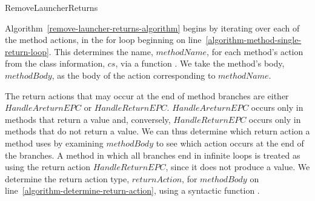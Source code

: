 \begin{algorithm}[ht]
\begin{algorithmic}[1]
    \label{algorithm-copy-ExecuteMethod-in-Started}
    \State {}
    \label{algorithm-ExecuteMethod-refinement-MainThread}
    \State {}
    \label{algorithm-ExecuteMethod-refinement-Started}
    \State {}
    \label{algorithm-remove-ExecuteMethod}
  \State {}
    \label{algorithm-reintroduce-ExecuteMethod}
    \State {}
    \label{algorithm-copy-ExecuteMethod-out-MainThread}
    \State {}
    \label{algorithm-copy-ExecuteMethod-out-Started}
  \end{algorithmic}
  \caption{RemoveLauncherReturns}
  \label{remove-launcher-returns-algorithm}
\end{algorithm}
  
Algorithm~\ref{remove-launcher-returns-algorithm} begins by iterating
over each of the method actions, in the for loop beginning on
line~\ref{algorithm-method-single-return-loop}.
This determines the name, $methodName$, for each method's action from
the class information, $cs$, via a function
.
We take the method's body, $methodBody$, as the body of the action
corresponding to $methodName$.

The return actions that may occur at the end of method branches are
either $HandleAreturnEPC$ or $HandleReturnEPC$.
$HandleAreturnEPC$ occurs only in methods that return a value and,
conversely, $HandleReturnEPC$ occurs only in methods that do not
return a value.
We can thus determine which return action a method uses by examining
$methodBody$ to see which action occurs at the end of the branches.
A method in which all branches end in infinite loops is treated as
using the return action $HandleReturnEPC$, since it does not produce a
value.
We determine the return action type, $returnAction$, for $methodBody$
on line~\ref{algorithm-determine-return-action}, using a syntactic
function .

